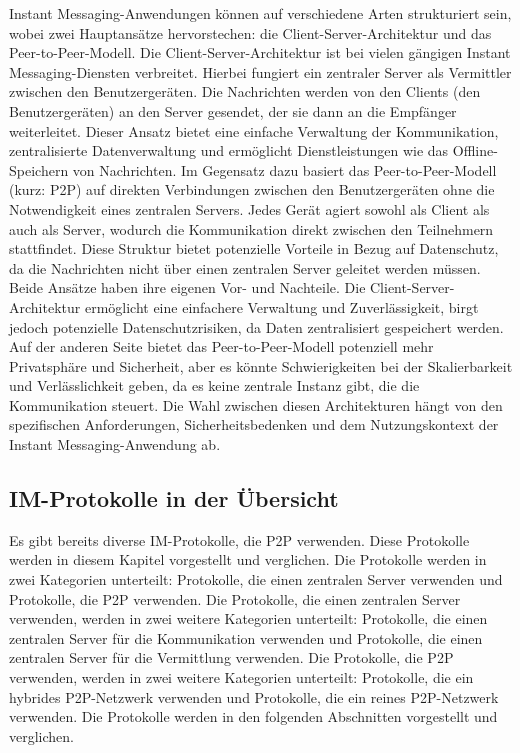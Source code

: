Instant Messaging-Anwendungen können auf verschiedene Arten strukturiert sein, wobei zwei Hauptansätze hervorstechen: die Client-Server-Architektur und das Peer-to-Peer-Modell.
Die Client-Server-Architektur ist bei vielen gängigen Instant Messaging-Diensten verbreitet. Hierbei fungiert ein zentraler Server als Vermittler zwischen den Benutzergeräten. Die Nachrichten werden von den Clients (den Benutzergeräten) an den Server gesendet, der sie dann an die Empfänger weiterleitet. Dieser Ansatz bietet eine einfache Verwaltung der Kommunikation, zentralisierte Datenverwaltung und ermöglicht Dienstleistungen wie das Offline-Speichern von Nachrichten.
Im Gegensatz dazu basiert das Peer-to-Peer-Modell (kurz: P2P) auf direkten Verbindungen zwischen den Benutzergeräten ohne die Notwendigkeit eines zentralen Servers. Jedes Gerät agiert sowohl als Client als auch als Server, wodurch die Kommunikation direkt zwischen den Teilnehmern stattfindet. Diese Struktur bietet potenzielle Vorteile in Bezug auf Datenschutz, da die Nachrichten nicht über einen zentralen Server geleitet werden müssen.
Beide Ansätze haben ihre eigenen Vor- und Nachteile. Die Client-Server-Architektur ermöglicht eine einfachere Verwaltung und Zuverlässigkeit, birgt jedoch potenzielle Datenschutzrisiken, da Daten zentralisiert gespeichert werden. Auf der anderen Seite bietet das Peer-to-Peer-Modell potenziell mehr Privatsphäre und Sicherheit, aber es könnte Schwierigkeiten bei der Skalierbarkeit und Verlässlichkeit geben, da es keine zentrale Instanz gibt, die die Kommunikation steuert. Die Wahl zwischen diesen Architekturen hängt von den spezifischen Anforderungen, Sicherheitsbedenken und dem Nutzungskontext der Instant Messaging-Anwendung ab.

\subsection{IM-Protokolle in der Übersicht}
Es gibt bereits diverse IM-Protokolle, die P2P verwenden. Diese Protokolle werden in diesem Kapitel
vorgestellt und verglichen. Die Protokolle werden in zwei Kategorien unterteilt: Protokolle, die
einen zentralen Server verwenden und Protokolle, die P2P verwenden. Die Protokolle, die einen
zentralen Server verwenden, werden in zwei weitere Kategorien unterteilt: Protokolle, die
einen zentralen Server für die Kommunikation verwenden und Protokolle, die einen zentralen
Server für die Vermittlung verwenden. Die Protokolle, die P2P verwenden, werden in zwei weitere
Kategorien unterteilt: Protokolle, die ein hybrides P2P-Netzwerk verwenden und Protokolle, die
ein reines P2P-Netzwerk verwenden. Die Protokolle werden in den folgenden Abschnitten vorgestellt
und verglichen.

